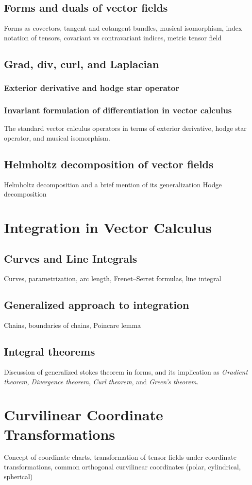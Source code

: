 \section{Forms and duals of vector fields}
Forms as covectors, tangent and cotangent bundles, musical isomorphism, index notation of tensors, covariant vs contravariant indices, metric tensor field
\section{Grad, div, curl, and Laplacian}
\subsection{Exterior derivative and hodge star operator}
\subsection{Invariant formulation of differentiation in vector calculus}
The standard vector calculus operators in terms of exterior derivative, hodge star operator, and musical isomorphism.

\section{Helmholtz decomposition of vector fields}
Helmholtz decomposition and a brief mention of its generalization Hodge decomposition

\chapter{Integration in Vector Calculus}
\section{Curves and Line Integrals}
Curves, parametrization, arc length, Frenet–Serret formulas, line integral
\section{Generalized approach to integration}
Chains, boundaries of chains, Poincare lemma
\section{Integral theorems}
Discussion of generalized stokes theorem in forms, and its implication as \emph{Gradient theorem}, \emph{Divergence theorem}, \emph{Curl theorem}, and \emph{Green's theorem}.

\chapter{Curvilinear Coordinate Transformations}
Concept of coordinate charts, transformation of tensor fields under coordinate transformations, common orthogonal curvilinear coordinates (polar, cylindrical, spherical)
